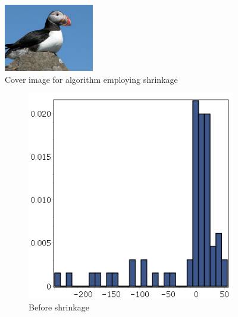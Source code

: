 \begin{figure}
	\centering
	\includegraphics[width=0.35\textwidth]{figures/puffin.jpg}
	\caption{Cover image for algorithm employing shrinkage \citep{imgPuffin}}
	\label{fig:puffin}
\end{figure}

\begin{figure}
    \centering
    \begin{subfigure}[b]{0.45\textwidth}
        \includegraphics[width=\textwidth]{figures/inputF5.png}
		\caption{Before shrinkage}
		\label{fig:InputF5}
    \end{subfigure}
    ~ %
    \begin{subfigure}[b]{0.45\textwidth}

\end{subfigure}
\end{figure}
